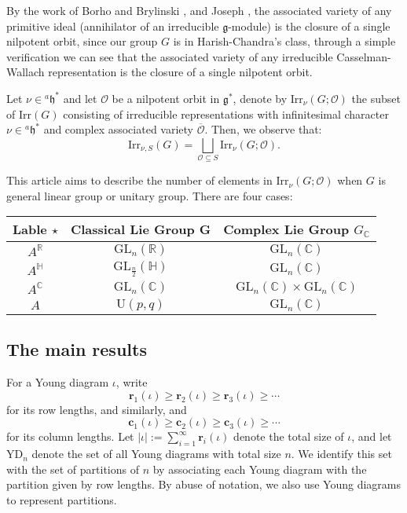 \documentclass[12pt, a4paper]{amsart}
\numberwithin{equation}{section}
\newcommand{\br}{{\mathbf{r}}}
\newcommand{\bc}{{\mathbf{c}}}
\newcommand{\BC}{{\mathbb {C}}}
\newcommand{\BH}{{\mathbb {H}}}
\newcommand{\BR}{{\mathbb {R}}}
\newcommand{\CO}{{\mathcal {O}}}
\newcommand{\fg}{\mathfrak{g}}
\newcommand{\fh}{\mathfrak{h}}
\newcommand{\GL}{{\mathrm{GL}}}
\newcommand{\U}{{\mathrm{U}}}
\newcommand{\Irr}{{\mathrm{Irr}}}
\renewcommand{\bar}{\overline}
\begin{document}
By the work of Borho and Brylinski \cite{BB}, and Joseph \cite{Jos}, the associated variety of any primitive ideal (annihilator of an irreducible $\fg$-module) is the closure of a single nilpotent orbit, since our group $G$ is in Harish-Chandra's class, through a simple verification we can see that the associated variety of any irreducible Casselman-Wallach representation is the closure of a single nilpotent orbit.

Let $\nu \in {^{a}\fh^*}$ and let $\CO$ be a nilpotent orbit in $\fg^*$,   denote by $\Irr_{\nu}(G;\CO)$ the subset of $\Irr(G)$ consisting of irreducible representations with infinitesimal character $\nu \in {^{a}\fh^*}$ and complex associated variety $\bar{\CO}$. Then, we observe that:
\begin{equation}\label{(1.3)}
    \Irr_{\nu,S}(G) = \bigsqcup_{\CO \subseteq S} \Irr_{\nu}(G;\CO).
\end{equation}

This article aims to describe the number of elements in $\Irr_{\nu}(G;\CO)$ when $G$ is general linear group or unitary group. There are four cases:

\begin{center}
   \begin{tabular}{ccc}
      \toprule
      Lable $\star $ & Classical Lie Group G & Complex Lie Group $G_{\BC}$    \\
      \midrule
      $A^{\BR}$      & $\GL_n(\BR)$          & $\GL_n(\BC)$                   \\
      $A^{\BH}$      & $\GL_{\frac{n}{2}}(\BH)$      & $\GL_n(\BC)$                   \\
      $A^{\BC}$      & $\GL_n(\BC)$          & $\GL_n(\BC) \times \GL_n(\BC)$ \\
      $A$            & $\U(p,q)$              & $\GL_n(\BC)$                   \\
      \bottomrule
   \end{tabular}
\end{center}



\subsection{The main results}
For a Young diagram $\iota$, write
$$\br_1(\iota) \geq \br_2(\iota) \geq \br_3(\iota) \geq \cdots$$
for its row lengths, and similarly, and
$$\bc_1(\iota) \geq \bc_2(\iota) \geq \bc_3(\iota) \geq \cdots$$
for its column lengths. Let $|\iota|:= \sum_{i=1}^{\infty}\br_i(\iota)$ denote the total size of $\iota$, and let $\mathrm{YD}_{n}$ denote the set of all Young diagrams with total size $n$. We identify this set with the set of partitions of $n$ by associating each Young diagram with the partition given by row lengths. By abuse of notation, we also use Young diagrams to represent partitions.
\end{document}
